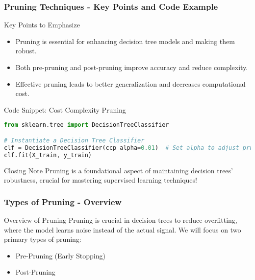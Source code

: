 \documentclass[aspectratio=169]{beamer}
\begin{document}
\begin{frame}[fragile]
  \frametitle{Pruning Techniques - Key Points and Code Example}
  \begin{block}{Key Points to Emphasize}
    \begin{itemize}
      \item Pruning is essential for enhancing decision tree models and making them robust.
      \item Both pre-pruning and post-pruning improve accuracy and reduce complexity.
      \item Effective pruning leads to better generalization and decreases computational cost.
    \end{itemize}
  \end{block}

  \begin{block}{Code Snippet: Cost Complexity Pruning}
    \begin{lstlisting}[language=Python]
from sklearn.tree import DecisionTreeClassifier

# Instantiate a Decision Tree Classifier
clf = DecisionTreeClassifier(ccp_alpha=0.01)  # Set alpha to adjust pruning level
clf.fit(X_train, y_train)
    \end{lstlisting}
  \end{block}

  \begin{block}{Closing Note}
    Pruning is a foundational aspect of maintaining decision trees' robustness, crucial for mastering supervised learning techniques!
  \end{block}
\end{frame}

\begin{frame}[fragile]
    \frametitle{Types of Pruning - Overview}
    \begin{block}{Overview of Pruning}
        Pruning is crucial in decision trees to reduce overfitting, where the model learns noise instead of the actual signal.
        We will focus on two primary types of pruning:
        \begin{itemize}
            \item Pre-Pruning (Early Stopping)
            \item Post-Pruning
        \end{itemize}
    \end{block}
\end{frame}
\end{document}
